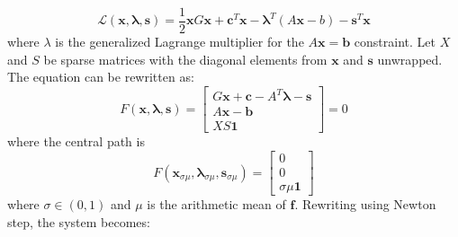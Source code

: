 \documentclass[12pt,a4paper,twoside]{report}
\begin{document}
{\begin{equation}
\mathcal{L}(\boldsymbol{x}, \boldsymbol{\lambda}, \boldsymbol{s}) = \frac{1}{2}\boldsymbol{x}G\boldsymbol{x} + \boldsymbol{c}^T\boldsymbol{x} - \boldsymbol{\lambda}^T(A\boldsymbol{x}-b) - \boldsymbol{s}^T
\boldsymbol{x}
\end{equation}
where $\lambda$ is the generalized Lagrange multiplier for the $A\boldsymbol{x} = \boldsymbol{b}$ constraint. Let $X$ and $S$ be sparse matrices with the diagonal elements from $\boldsymbol{x}$ and $\boldsymbol{s}$ unwrapped. The equation can be rewritten as:
\begin{equation}
F(\boldsymbol{x}, \boldsymbol{\lambda}, \boldsymbol{s}) = 
	\begin{bmatrix}
G\boldsymbol{x} + \boldsymbol{c}-A^T\boldsymbol{\lambda} - \boldsymbol{s}\\
A\boldsymbol{x}-\boldsymbol{b} \\
XS\boldsymbol{1}
	\end{bmatrix} = 0
\end{equation}
where the central path is
\begin{equation}
	F(\boldsymbol{x}_{\sigma\mu}, \boldsymbol{\lambda}_{\sigma\mu}, \boldsymbol{s}_{\sigma\mu}) = \begin{bmatrix}
	0 \\ 0 \\ \sigma\mu \boldsymbol{1}
	\end{bmatrix}
\end{equation}
where $\sigma \in (0,1)$ and $\mu$ is the arithmetic mean of $\boldsymbol{f}$. Rewriting using Newton step, the system becomes:

}
\end{document}
